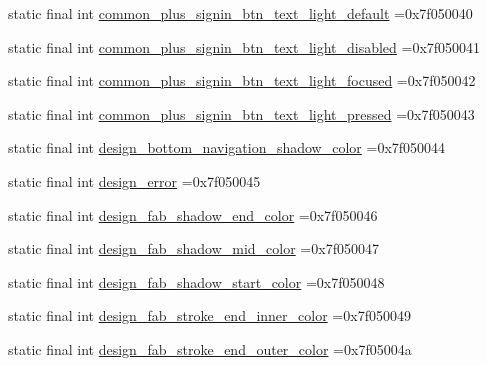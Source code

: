 \begin{DoxyCompactItemize}
static final int \mbox{\hyperlink{classbr_1_1unb_1_1cic_1_1mp_1_1marketmaster_1_1R_1_1color_af80a82a6deb57ed46f62cc4276445fd4}{common\+\_\+plus\+\_\+signin\+\_\+btn\+\_\+text\+\_\+light\+\_\+default}} =0x7f050040
\item 
static final int \mbox{\hyperlink{classbr_1_1unb_1_1cic_1_1mp_1_1marketmaster_1_1R_1_1color_a95ffb75738f12da1b53fd19802cd41be}{common\+\_\+plus\+\_\+signin\+\_\+btn\+\_\+text\+\_\+light\+\_\+disabled}} =0x7f050041
\item 
static final int \mbox{\hyperlink{classbr_1_1unb_1_1cic_1_1mp_1_1marketmaster_1_1R_1_1color_ac7d235277afaa64dbc9f7cbadf39a8ba}{common\+\_\+plus\+\_\+signin\+\_\+btn\+\_\+text\+\_\+light\+\_\+focused}} =0x7f050042
\item 
static final int \mbox{\hyperlink{classbr_1_1unb_1_1cic_1_1mp_1_1marketmaster_1_1R_1_1color_af469dc0d2fda14cbbd66f05b28720c4d}{common\+\_\+plus\+\_\+signin\+\_\+btn\+\_\+text\+\_\+light\+\_\+pressed}} =0x7f050043
\item 
static final int \mbox{\hyperlink{classbr_1_1unb_1_1cic_1_1mp_1_1marketmaster_1_1R_1_1color_a2df52b1c55137af01c54158c775e561b}{design\+\_\+bottom\+\_\+navigation\+\_\+shadow\+\_\+color}} =0x7f050044
\item 
static final int \mbox{\hyperlink{classbr_1_1unb_1_1cic_1_1mp_1_1marketmaster_1_1R_1_1color_a8f749c1e88214790470874dcd378d7d4}{design\+\_\+error}} =0x7f050045
\item 
static final int \mbox{\hyperlink{classbr_1_1unb_1_1cic_1_1mp_1_1marketmaster_1_1R_1_1color_a3b2713566188f20d7c16a675ea701c2b}{design\+\_\+fab\+\_\+shadow\+\_\+end\+\_\+color}} =0x7f050046
\item 
static final int \mbox{\hyperlink{classbr_1_1unb_1_1cic_1_1mp_1_1marketmaster_1_1R_1_1color_a935052ca555909e389f44841390e3a86}{design\+\_\+fab\+\_\+shadow\+\_\+mid\+\_\+color}} =0x7f050047
\item 
static final int \mbox{\hyperlink{classbr_1_1unb_1_1cic_1_1mp_1_1marketmaster_1_1R_1_1color_ad7653c2ad88a77fbb6f8ff98c79537f9}{design\+\_\+fab\+\_\+shadow\+\_\+start\+\_\+color}} =0x7f050048
\item 
static final int \mbox{\hyperlink{classbr_1_1unb_1_1cic_1_1mp_1_1marketmaster_1_1R_1_1color_a6b15ecda904fed64dc84e61873a80af2}{design\+\_\+fab\+\_\+stroke\+\_\+end\+\_\+inner\+\_\+color}} =0x7f050049
\item 
static final int \mbox{\hyperlink{classbr_1_1unb_1_1cic_1_1mp_1_1marketmaster_1_1R_1_1color_a54c21f49db2450c865d9a052e08f1ae3}{design\+\_\+fab\+\_\+stroke\+\_\+end\+\_\+outer\+\_\+color}} =0x7f05004a

\end{DoxyCompactItemize}
